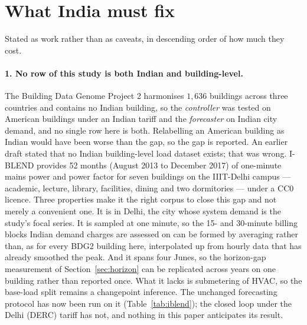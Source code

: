 \section{What India must fix}
\label{sec:india-fix}

Stated as work rather than as caveats, in descending order of how much they
cost.

\paragraph{1. No row of this study is both Indian and building-level.} The
Building Data Genome Project 2 harmonises $1{,}636$ buildings across three
countries and contains no Indian building, so the \emph{controller} was tested
on American buildings under an Indian tariff and the \emph{forecaster} on Indian
city demand, and no single row here is both. Relabelling an American building as
Indian would have been worse than the gap, so the gap is reported. An earlier
draft stated that no Indian building-level load dataset exists; that was wrong.
I-BLEND \citep{rashid2019iblend} provides 52 months (August 2013 to December
2017) of one-minute mains power and power factor for seven buildings on the
IIIT-Delhi campus --- academic, lecture, library, facilities, dining and two
dormitories --- under a CC0 licence. Three properties make it the right
corpus to close this gap and not merely a convenient one. It is in Delhi, the
city whose system demand is the study's focal series. It is sampled at one
minute, so the 15- and 30-minute billing blocks Indian demand charges are
assessed on can be formed by averaging rather than, as for every BDG2 building
here, interpolated up from hourly data that has already smoothed the peak. And
it spans four Junes, so the horizon-gap measurement of
Section~\ref{sec:horizon} can be replicated across years on one building rather
than reported once. What it lacks is submetering of HVAC, so the base-load
split remains a changepoint inference. The unchanged forecasting protocol has now been run on it
(Table~\ref{tab:iblend}); the closed loop under the Delhi (DERC) tariff has
not, and nothing in this paper anticipates its result.

